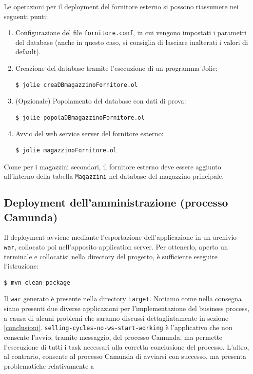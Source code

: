 \documentclass[twoside]{article}
\begin{document}
Le operazioni per il deployment del fornitore esterno si possono riassumere nei seguenti punti:
\begin{enumerate}
	\item Configurazione del file \texttt{fornitore.conf}, in cui vengono
		  impostati i parametri del database (anche in questo caso, si consiglia di lasciare
		  inalterati i valori di default).
	\item Creazione del database tramite l'esecuzione di un programma Jolie:
\begin{lstlisting}
$ jolie creaDBmagazzinoFornitore.ol
\end{lstlisting}
	\item (Opzionale) Popolamento del database con dati di prova:
\begin{lstlisting}
$ jolie popolaDBmagazzinoFornitore.ol
\end{lstlisting}
	\item Avvio del web service server del fornitore esterno:
\begin{lstlisting}
$ jolie magazzinoFornitore.ol
\end{lstlisting}
\end{enumerate}

Come per i magazzini secondari, il fornitore esterno deve essere aggiunto all'interno
della tabella \texttt{Magazzini} nel database del magazzino principale.

\subsection{Deployment dell'amministrazione (processo Camunda)}
Il deployment avviene mediante l'esportazione dell'applicazione in un archivio \texttt{war},
collocato poi nell'apposito application server. Per ottenerlo, aperto un terminale e collocatisi
nella directory del progetto, è sufficiente eseguire l'istruzione:
\begin{lstlisting}
$ mvn clean package
\end{lstlisting}
Il \texttt{war} generato è presente nella directory \texttt{target}.
Notiamo come nella consegna siano presenti due diverse applicazioni per l'implementazione
del business process, a causa di alcuni problemi che saranno discussi dettagliatamente in
sezione \ref{conclusioni}.
\texttt{selling-cycles-no-ws-start-working} è l'applicativo che non consente l'avvio, tramite
messaggio, del processo Camunda, ma permette l'esecuzione di tutti i task necessari alla
corretta conclusione del processo. L'altro, al contrario, consente al processo Camunda di
avviarsi con successo, ma presenta problematiche relativamente a
\end{document}
